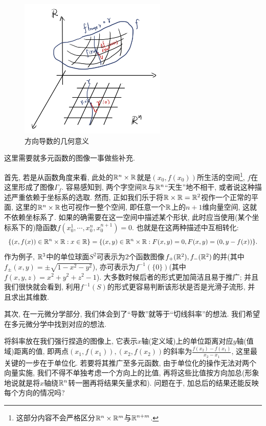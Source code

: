 \begin{figure}[H]
	\centering
	\includegraphics[width=7cm]{attachment/IMG_3923.jpg}
	\caption{方向导数的几何意义}
\end{figure}

这里需要就多元函数的图像一事做些补充. 

首先, 若是从函数角度来看, 此处的$\mathbb{R} ^n \times \mathbb{R}$就是$(x_0,f(x_0))$所生活的空间\footnote{这部分内容不会严格区分$\mathbb{R} ^n \times \mathbb{R} ^m$与$\mathbb{R} ^{n+m}$. }, $f$在这里形成了图像$\Gamma _f$. 容易感知到, 两个字空间$\mathbb{R}$与$\mathbb{R} ^n$“天生”地不相干, 或者说这种描述严重依赖于坐标系的选取. 然而, 正如我们乐于将$\mathbb{R} \times \mathbb{R} = \mathbb{R} ^2$视作一个正常的平面, 这里的$\mathbb{R} ^n \times \mathbb{R}$也可视作一整个空间, 即任意一个$\mathbb{R}$上的$n+1$维向量空间, 这就不依赖坐标系了. 如果的确需要在这一空间中描述某个形状, 此时应当使用(某个坐标系下的)隐函数$f(x_0^1,\cdots ,x_0^n,x_0^{n+1})=0$. 也就是在这两种描述中互相转化: $$\{ (x,f(x)) \in \mathbb{R} ^n \times \mathbb{R} : x \in \mathbb{R} \} = \{ (x,y) \in \mathbb{R} ^n \times \mathbb{R} : F(x,y)=0,F(x,y)=(0,y-f(x)) \}.$$
作为例子, $\mathbb{R} ^3$中的单位球面$S^2$可表示为$2$个函数图像$f_+(\mathbb{R} ^2),f_-(\mathbb{R} ^2)$的并(其中$f_{\pm} (x,y)= \pm \sqrt{1-x^2-y^2}$), 亦可表示为$f^{-1}(\{ 0 \})$(其中$f(x,y,z) = x^2+y^2+z^2-1$). 大多数时候后者的形式更加简洁且易于推广; 并且我们很快就会看到, 利用$f^{-1}(S)$的形式更容易判断该形状是否是光滑子流形, 并且求出其维数. 

其次, 在一元微分学部分, 我们体会到了“导数”就等于“切线斜率”的想法. 我们希望在多元微分学中找到对应的想法. 

将斜率放在我们强行捏造的图像上, 它表示$x$轴(定义域)上的单位距离对应$y$轴(值域)距离的值, 即两点$(x_1,f(x_1)),(x_2,f(x_2))$的斜率为$\frac{f(x_2)-f(x_1)}{x_2-x_1}$, 这里最关键的一步在于单位化. 若要将其推广至多元函数, 由于单位化的操作无法对两个向量实施, 我们不得不单独考虑一个方向上的比值, 再将这些比值按方向加总(形象地说就是将$x$轴绕$\mathbb{R} ^n$转一圈再将结果矢量求和). 问题在于, 加总后的结果还能反映每个方向的情况吗? 

